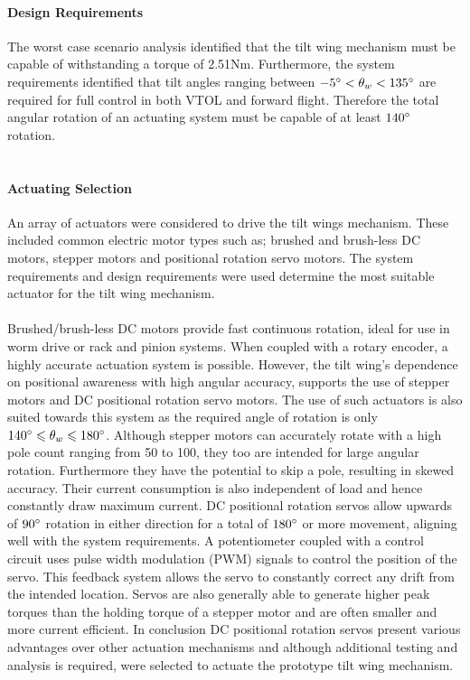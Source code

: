 \paragraph{Design Requirements}
The worst case scenario analysis identified that the tilt wing mechanism must be capable of withstanding a torque of 2.51Nm. Furthermore, the system requirements identified that tilt angles ranging between \(-5\degree<\theta_w<135\degree\) are required for full control in both VTOL and forward flight. Therefore the total angular rotation of an actuating system must be capable of at least \(140\degree\) rotation.  \\
\\
\paragraph{Actuating Selection}
An array of actuators were considered to drive the tilt wings mechanism. These included common electric motor types such as; brushed and brush-less DC motors, stepper motors and positional rotation servo motors. The system requirements and design requirements were used determine the most suitable actuator for the tilt wing mechanism.\\
\\
Brushed/brush-less DC motors provide fast continuous rotation, ideal for use in worm drive or rack and pinion systems. When coupled with a rotary encoder, a highly accurate actuation system is possible. However, the tilt wing's dependence on positional awareness with high angular accuracy, supports the use of stepper motors and DC positional rotation servo motors. The use of such actuators is also suited towards this system as the required angle of rotation is only \(140\degree\leqslant\theta_w\leqslant180\degree\). Although stepper motors can accurately rotate with a high pole count ranging from 50 to 100, they too are intended for large angular rotation. Furthermore they have the potential to skip a pole, resulting in skewed accuracy. Their current consumption is also independent of load and hence constantly draw maximum current. DC positional rotation servos allow upwards of \(90\degree\) rotation in either direction for a total of \(180\degree\) or more movement, aligning well with the system requirements. A potentiometer coupled with a control circuit uses pulse width modulation (PWM) signals to control the position of the servo. This feedback system allows the servo to constantly correct any drift from the intended location. Servos are also generally able to generate higher peak torques than the holding torque of a stepper motor and are often smaller and more current efficient. In conclusion DC positional rotation servos present various advantages over other actuation mechanisms and although additional testing and analysis is required, were selected to actuate the prototype tilt wing mechanism. \\
